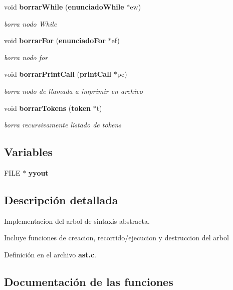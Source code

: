 \begin{CompactItemize}
void {\bf borrar\-While} ({\bf enunciado\-While} $\ast$ew)
\begin{CompactList}\small\item\em borra nodo While \item\end{CompactList}\item 
void {\bf borrar\-For} ({\bf enunciado\-For} $\ast$ef)
\begin{CompactList}\small\item\em borra nodo for \item\end{CompactList}\item 
void {\bf borrar\-Print\-Call} ({\bf print\-Call} $\ast$pc)
\begin{CompactList}\small\item\em borra nodo de llamada a imprimir en archivo \item\end{CompactList}\item 
void {\bf borrar\-Tokens} ({\bf token} $\ast$t)
\begin{CompactList}\small\item\em borra recursivamente listado de tokens \item\end{CompactList}\end{CompactItemize}
\subsection*{Variables}
\begin{CompactItemize}
\item 
FILE $\ast$ {\bf yyout}
\end{CompactItemize}


\subsection{Descripci\'{o}n detallada}
Implementacion del arbol de sintaxis abstracta. 

Incluye funciones de creacion, recorrido/ejecucion y destruccion del arbol 

Definici\'{o}n en el archivo {\bf ast.c}.

\subsection{Documentaci\'{o}n de las funciones}
